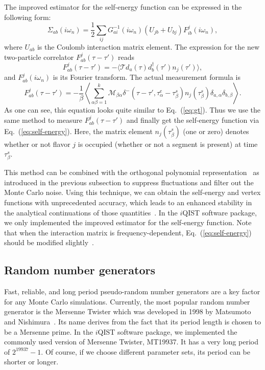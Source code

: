 The improved estimator for the self-energy function can be expressed in the following form:
\begin{equation}
\label{eq:self-energy}
\Sigma_{ab}(i\omega_n) = \frac{1}{2} 
\sum_{ij} G^{-1}_{ai}(i\omega_n) (U_{jb} + U_{bj}) F^{j}_{ib}(i\omega_n),
\end{equation}
where $U_{ab}$ is the Coulomb interaction matrix element. The expression for the new two-particle correlator $F^{j}_{ab}(\tau - \tau')$ reads
\begin{equation}
F^{j}_{ab}(\tau-\tau') 
= -\langle \mathcal{T} d_{a}(\tau) d^{\dagger}_{b}(\tau') n_{j}(\tau') \rangle,
\end{equation}
and $F^{j}_{ab}(i\omega_n)$ is its Fourier transform. The actual measurement formula is
\begin{equation}
F^{j}_{ab}(\tau - \tau') = 
-\frac{1}{\beta}
\left\langle
\sum_{\alpha\beta = 1}^{k} 
\mathcal{M}_{\beta\alpha}\delta^{-}(\tau-\tau', \tau^{e}_{\alpha} - \tau^{s}_{\beta})
n_{j}(\tau^s_\beta)\delta_{a,\alpha}\delta_{b,\beta}
\right\rangle.
\end{equation}
As one can see, this equation looks quite similar to Eq.~(\ref{eq:gt}). Thus we use the same method to measure $F^{j}_{ab}(\tau - \tau')$ and finally get the self-energy function via Eq.~(\ref{eq:self-energy}). Here, the matrix element $n_{j}(\tau^s_\beta)$ (one or zero) denotes whether or not flavor $j$ is occupied (whether or not a segment is present) at time $\tau^s_\beta$.

This method can be combined with the orthogonal polynomial representation~\cite{PhysRevB.84.075145} as introduced in the previous subsection to suppress fluctuations and filter out the Monte Carlo noise. Using this technique, we can obtain the self-energy and vertex functions with unprecedented accuracy, which leads to an enhanced stability in the analytical continuations of those quantities~\cite{PhysRevB.85.205106}. In the $i$QIST software package, we only implemented the improved estimator for the self-energy function. Note that when the interaction matrix is frequency-dependent, Eq.~(\ref{eq:self-energy}) should be modified slightly~\cite{PhysRevB.89.235128}.

\subsection{Random number generators}
Fast, reliable, and long period pseudo-random number generators are a key factor for any Monte Carlo simulations. Currently, the most popular random number generator is the Mersenne Twister which was developed in 1998 by Matsumoto and Nishimura~\cite{Matsumoto:1998}. Its name derives from the fact that its period length is chosen to be a Mersenne prime. In the $i$QIST software package, we implemented the commonly used version of Mersenne Twister, MT19937. It has a very long period of $2^{19937}-1$. Of course, if we choose different parameter sets, its period can be shorter or longer.

